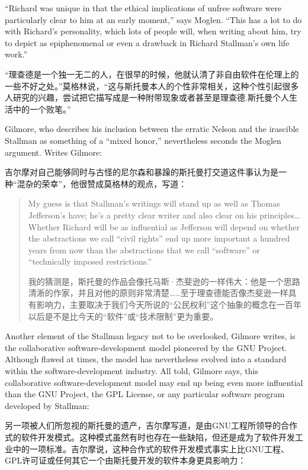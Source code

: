 \ifdefined\eng
``Richard was unique in that the ethical implications of unfree software were particularly clear to him at an early moment,'' says Moglen. ``This has a lot to do with Richard's personality, which lots of people will, when writing about him, try to depict as epiphenomenal or even a drawback in Richard Stallman's own life work.''
\fi

\ifdefined\chs
“理查德是一个独一无二的人，在很早的时候，他就认清了非自由软件在伦理上的一些不好之处。”莫格林说，“这与斯托曼本人的个性非常相关，这种个性引起很多人研究的兴趣，尝试把它描写成是一种附带现象或者甚至是理查德.斯托曼个人生活中的一个败笔。”
\fi

\ifdefined\eng
Gilmore, who describes his inclusion between the erratic Nelson and the irascible Stallman as something of a ``mixed honor,'' nevertheless seconds the Moglen argument. Writes Gilmore:
\fi

\ifdefined\chs
吉尔摩对自己能够同时与古怪的尼尔森和暴躁的斯托曼打交道这件事认为是一种“混杂的荣幸”，他很赞成莫格林的观点，写道：
\fi

\begin{quote}
\ifdefined\eng
My guess is that Stallman's writings will stand up as well as Thomas Jefferson's have; he's a pretty clear writer and also clear on his principles\ldots Whether Richard will be as influential as Jefferson will depend on whether the abstractions we call ``civil rights'' end up more important a hundred years from now than the abstractions that we call ``software'' or ``technically imposed restrictions.''
\fi

\ifdefined\chs
我的猜测是，斯托曼的作品会像托马斯·杰斐逊的一样伟大：他是一个思路清淅的作家，并且对他的原则非常清楚……至于理查德能否像杰斐逊一样具有影响力，主要取决于我们今天所说的“公民权利”这个抽象的概念在一百年以后是不是比今天的“软件”或“技术限制”更为重要。
\fi
\end{quote}

\ifdefined\eng
Another element of the Stallman legacy not to be overlooked, Gilmore writes, is the collaborative software-development model pioneered by the GNU Project. Although flawed at times, the model has nevertheless evolved into a standard within the software-development industry. All told, Gilmore says, this collaborative software-development model may end up being even more influential than the GNU Project, the GPL License, or any particular software program developed by Stallman:
\fi

\ifdefined\chs
另一项被人们所忽视的斯托曼的遗产，吉尔摩写道，是由GNU工程所领导的合作式的软件开发模式。这种模式虽然有时也存在一些缺陷，但还是成为了软件开发工业中的一项标准。吉尔摩说，这种合作式的软件开发模式事实上比GNU工程、GPL许可证或任何其它一个由斯托曼开发的软件本身更具影响力：
\fi

